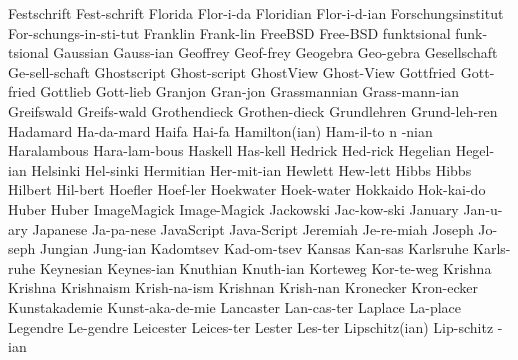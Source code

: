 \1 Festschrift		Fest-schrift
\1 Florida		Flor-i-da
\1 Floridian		Flor-i-d-ian
\1 Forschungsinstitut	For-schungs-in-sti-tut
\NewWordtrue
\1 Franklin		Frank-lin		%
\1 FreeBSD		Free-BSD		%
\1 funktsional		funk-tsional
\1 Gaussian		Gauss-ian
\NewWordtrue
\1 Geoffrey		Geof-frey		%
\NewWordtrue
\1 Geogebra		Geo-gebra		%
\1 Gesellschaft 	Ge-sell-schaft		%
\1 Ghostscript		Ghost-script		%
\1 GhostView		Ghost-View		%
\1 Gottfried		Gott-fried		%
\1 Gottlieb		Gott-lieb		%
\NewWordtrue
\1 Granjon	 	Gran-jon		%
\1 Grassmannian		Grass-mann-ian		%
\1 Greifswald		Greifs-wald
\1 Grothendieck		Grothen-dieck
\1 Grundlehren		Grund-leh-ren
\1 Hadamard		Ha-da-mard		%
\1 Haifa		Hai-fa
\3 Hamilton(ian)	Ham-il-to n -nian	%
\NewWordtrue
\1 Haralambous		Hara-lam-bous		%
\NewWordtrue
\1 Haskell		Has-kell		%
\NewWordtrue
\1 Hedrick		Hed-rick		%
\NewWordtrue
\1 Hegelian		Hegel-ian		%
\1 Helsinki		Hel-sinki
\1 Hermitian		Her-mit-ian
\NewWordtrue
\1 Hewlett 		Hew-lett		%
\1 Hibbs		Hibbs
\NewWordtrue
\1 Hilbert		Hil-bert		%
\1 Hoefler		Hoef-ler		%
\1 Hoekwater		Hoek-water		%
\1 Hokkaido		Hok-kai-do
\1 Huber		Huber			%
\1 ImageMagick		Image-Magick		%
\1 Jackowski		Jac-kow-ski		%
\1 January		Jan-u-ary
\1 Japanese		Ja-pa-nese
\1 JavaScript		Java-Script		%
\NewWordtrue
\1 Jeremiah		Je-re-miah		%
\NewWordtrue
\1 Joseph		Jo-seph			%
\1 Jungian		Jung-ian		%
\1 Kadomtsev		Kad-om-tsev
\1 Kansas		Kan-sas
\1 Karlsruhe		Karls-ruhe
\1 Keynesian		Keynes-ian		%
\NewWordtrue
\1 Knuthian		Knuth-ian		%
\1 Korteweg		Kor-te-weg
\1 Krishna		Krishna
\1 Krishnaism		Krish-na-ism
\1 Krishnan		Krish-nan		%
\1 Kronecker		Kron-ecker		%
\NewWordtrue
\1 Kunstakademie	Kunst-aka-de-mie	%
\1 Lancaster		Lan-cas-ter
\NewWordtrue
\1 Laplace		La-place		%
\1 Legendre		Le-gendre
\1 Leicester		Leices-ter
\NewWordtrue
\1 Lester		Les-ter 		%
\2 Lipschitz(ian)	Lip-schitz -ian
